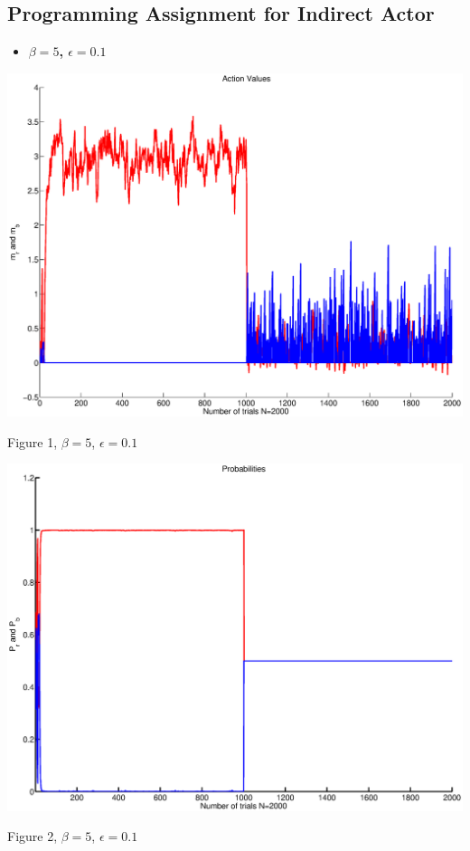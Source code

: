 \documentclass{article}
\begin{document}
\subsection{Programming Assignment for Indirect Actor}

\begin{itemize}
 \item \textbf{ $\beta=5$, $\epsilon=0.1$}
\end{itemize}

\begin{center}
\includegraphics[width=\textwidth]{action1.eps}
\begin{footnotesize}
 Figure 1, $\beta=5$, $\epsilon=0.1$
\end{footnotesize}
\end{center}

\begin{center}
\includegraphics[width=\textwidth]{prob1.eps}
\begin{footnotesize}
 Figure 2, $\beta=5$, $\epsilon=0.1$
\end{footnotesize}
\end{center}
\end{document}

